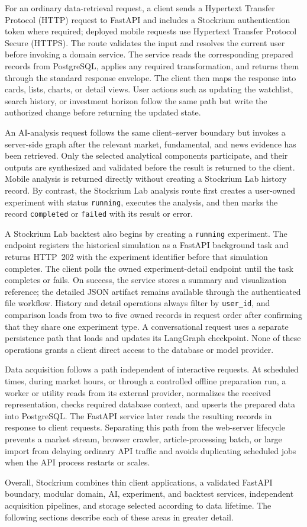 For an ordinary data-retrieval request, a client sends a Hypertext Transfer Protocol (HTTP) request to FastAPI and includes a Stockrium authentication token where required; deployed mobile requests use Hypertext Transfer Protocol Secure (HTTPS). The route validates the input and resolves the current user before invoking a domain service. The service reads the corresponding prepared records from PostgreSQL, applies any required transformation, and returns them through the standard response envelope. The client then maps the response into cards, lists, charts, or detail views. User actions such as updating the watchlist, search history, or investment horizon follow the same path but write the authorized change before returning the updated state.

An AI-analysis request follows the same client--server boundary but invokes a server-side graph after the relevant market, fundamental, and news evidence has been retrieved. Only the selected analytical components participate, and their outputs are synthesized and validated before the result is returned to the client. Mobile analysis is returned directly without creating a Stockrium Lab history record. By contrast, the Stockrium Lab analysis route first creates a user-owned experiment with status \texttt{running}, executes the analysis, and then marks the record \texttt{completed} or \texttt{failed} with its result or error.

A Stockrium Lab backtest also begins by creating a \texttt{running} experiment. The endpoint registers the historical simulation as a FastAPI background task and returns HTTP~202 with the experiment identifier before that simulation completes. The client polls the owned experiment-detail endpoint until the task completes or fails. On success, the service stores a summary and visualization reference; the detailed JSON artifact remains available through the authenticated file workflow. History and detail operations always filter by \texttt{user\_id}, and comparison loads from two to five owned records in request order after confirming that they share one experiment type. A conversational request uses a separate persistence path that loads and updates its LangGraph checkpoint. None of these operations grants a client direct access to the database or model provider.

Data acquisition follows a path independent of interactive requests. At scheduled times, during market hours, or through a controlled offline preparation run, a worker or utility reads from its external provider, normalizes the received representation, checks required database context, and upserts the prepared data into PostgreSQL. The FastAPI service later reads the resulting records in response to client requests. Separating this path from the web-server lifecycle prevents a market stream, browser crawler, article-processing batch, or large import from delaying ordinary API traffic and avoids duplicating scheduled jobs when the API process restarts or scales.

Overall, Stockrium combines thin client applications, a validated FastAPI boundary, modular domain, AI, experiment, and backtest services, independent acquisition pipelines, and storage selected according to data lifetime. The following sections describe each of these areas in greater detail.
